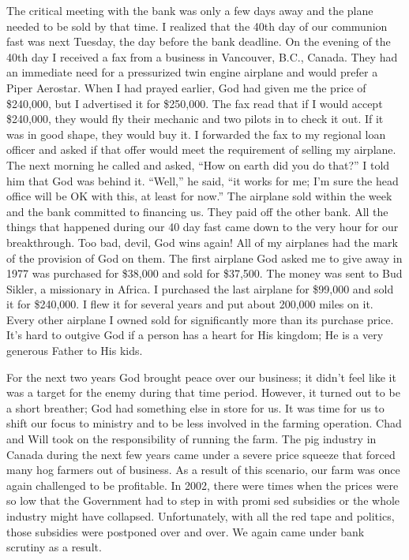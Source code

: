 \documentclass[oneside]{book}
\begin{document}
The critical meeting with the bank was only a few days away and the plane needed to be sold by that time. I realized that the 40th day of our communion fast was next Tuesday, the day before the bank deadline. On the evening of the 40th day I received a fax from a business in Vancouver, B.C., Canada. They had an immediate need for a pressurized twin engine airplane and would prefer a Piper Aerostar. When I had prayed earlier, God had given me the price of \$240,000, but I advertised it for \$250,000. The fax read that if I would accept \$240,000, they would fly their mechanic and two pilots in to check it out. If it was in good shape, they would buy it. I forwarded the fax to my regional loan officer and asked if that offer would meet the requirement of selling my airplane. The next morning he called and asked, “How on earth did you do that?” I told him that God was behind it. “Well,” he said, “it works for me; I’m sure the head office will be OK with this, at least for now.” The airplane sold within the week and the bank committed to financing us. They paid off the other bank. All the things that happened during our 40 day fast came down to the very hour for our breakthrough. Too bad, devil, God wins again! All of my airplanes had the mark of the provision of God on them. The first airplane God asked me to give away in 1977 was purchased for \$38,000 and sold for \$37,500. The money was sent to Bud Sikler, a missionary in Africa. I purchased the last airplane for \$99,000 and sold it for \$240,000. I flew it for several years and put about 200,000 miles on it. Every other airplane I owned sold for significantly more than its purchase price. It’s hard to outgive God if a person has a heart for His kingdom; He is a very generous Father to His kids.

For the next two years God brought peace over our business; it didn’t feel like it was a target for the enemy during that time period. However, it turned out to be a short breather; God had something else in store for us. It was time for us to shift our focus to ministry and to be less involved in the farming operation. Chad and Will took on the responsibility of running the farm. The pig industry in Canada during the next few years came under a severe price squeeze that forced many hog farmers out of business. As a result of this scenario, our farm was once again challenged to be profitable. In 2002, there were times when the prices were so low that the Government had to step in with promi
sed subsidies or the whole industry might have collapsed. Unfortunately, with all the red tape and politics, those subsidies were postponed over and over. We again came under bank scrutiny as a result.
\end{document}
